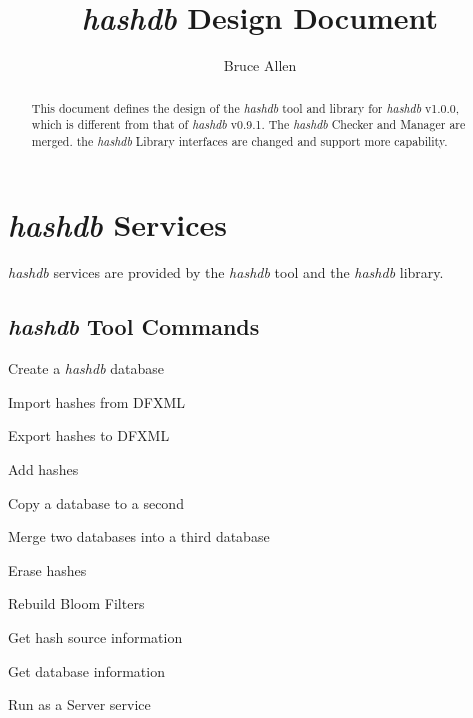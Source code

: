 \documentclass[12pt,twoside]{article}
\newcommand{\hdb}{\emph{hashdb}\xspace}
\begin{document}
\title{\hdb Design Document}
\author{Bruce Allen}
\maketitle

\begin{abstract}
This document defines the design of the \hdb tool and library
for \hdb v1.0.0, which is different from that of \hdb v0.9.1.
The \hdb Checker and Manager are merged.
the \hdb Library interfaces are changed and support more capability.
\end{abstract}

\section{\hdb Services}
\hdb services are provided by the \hdb tool and the \hdb library.
\subsection{\hdb Tool Commands}
\begin{compactitem}
\item Create a \hdb database
\item Import hashes from DFXML
\item Export hashes to DFXML
\item Add hashes
\item Copy a database to a second
\item Merge two databases into a third database
\item Erase hashes
\item Rebuild Bloom Filters
\item Get hash source information
\item Get database information
\item Run as a Server service
\end{compactitem}
\end{document}
